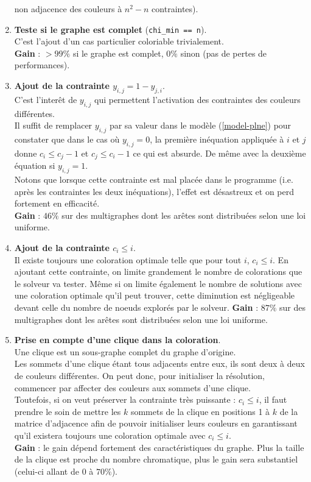 \begin{enumerate}
      non adjacence des couleurs à  $n^2 - n$ contraintes).
 \item \label{p5}\textbf{Teste si le graphe est complet} (\verb?chi_min == n?).\\
    C'est l'ajout d'un cas particulier coloriable trivialement.\\
    \textbf{Gain} : $>99\%$ si le graphe est complet, $0\%$ sinon (pas de pertes
    de performances).
 \item \label{p6}\textbf{Ajout de la contrainte $y_{i,j}=1-y_{j,i}$}.\\
      C'est l'interêt de $y_{i,j}$ qui permettent l'activation des contraintes des couleurs différentes.\\
      Il suffit de remplacer $y_{i,j}$ par sa valeur dans le modèle (\ref{model-plne}) pour constater que dans le cas où
      $y_{i,j}=0$, la première inéquation appliquée à $i$ et $j$ donne $c_i\leq c_j - 1$ et $c_j \leq c_i - 1$
      ce qui est absurde. De même avec la deuxième équation si $y_{i,j}=1$.\\
      Notons que lorsque cette contrainte est mal placée dans le programme (i.e. après les contraintes les
      deux inéquations), l'effet est désastreux et on perd fortement en efficacité.\\
      \textbf{Gain} : $46\%$ sur des multigraphes dont les arêtes sont distribuées selon
      une loi uniforme.
 \item \label{p7}\textbf{Ajout de la contrainte $c_i \leq i$}.\\
    Il existe toujours une coloration optimale telle que pour tout $i$, $c_i \leq i$.
    En ajoutant cette contrainte, on limite grandement le nombre de colorations que
    le solveur va tester. Même si on limite également le nombre de solutions avec une coloration
    optimale qu'il peut trouver, cette diminution est négligeable devant celle du nombre
    de noeuds explorés par le solveur.
    \textbf{Gain} : $87\%$ sur des multigraphes dont les arêtes sont distribuées selon
      une loi uniforme.
\item \label{p8}\textbf{Prise en compte d'une clique dans la coloration}.\\
    Une clique est un sous-graphe complet du graphe d'origine.\\
    Les sommets d'une clique étant tous adjacents entre eux, ils sont deux à deux de couleurs
    différentes. On peut donc, pour initialiser la résolution, commencer par affecter
    des couleurs aux sommets d'une clique.\\
    Toutefois, si on veut préserver la contrainte très puissante : $c_i\leq i$, il faut prendre
    le soin de mettre les $k$ sommets de la clique en positions 1 à $k$ de la matrice d'adjacence
    afin de pouvoir initialiser leurs couleurs en garantissant qu'il existera toujours une coloration
    optimale avec $c_i\leq i$.\\
    \textbf{Gain} : le gain dépend fortement des caractéristiques du graphe. Plus la taille de la
    clique est proche du nombre chromatique, plus le gain sera substantiel (celui-ci allant de $0$
    à $70\%$).
\end{enumerate}


